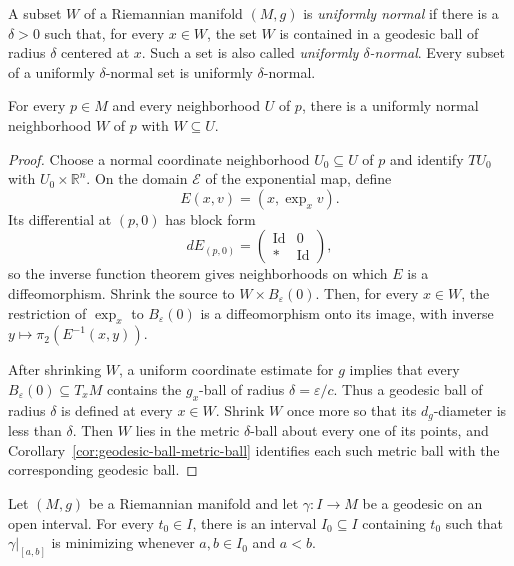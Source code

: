 A subset $W$ of a Riemannian manifold $(M,g)$ is \emph{uniformly normal} if
there is a $\delta>0$ such that, for every $x\in W$, the set $W$ is contained
in a geodesic ball of radius $\delta$ centered at $x$. Such a set is also called
\emph{uniformly $\delta$-normal}. Every subset of a uniformly
$\delta$-normal set is uniformly $\delta$-normal.

\begin{lemma}
\label{lem:uniformly-normal-neighborhood}
For every $p\in M$ and every neighborhood $U$ of $p$, there is a uniformly
normal neighborhood $W$ of $p$ with $W\subseteq U$.
\end{lemma}

\begin{proof}
\sketch Choose a normal coordinate neighborhood $U_0\subseteq U$ of $p$ and
identify $TU_0$ with $U_0\times\mathbb R^n$. On the domain $\mathcal E$ of the
exponential map, define
\[
E(x,v)=(x,\exp_xv).
\]
Its differential at $(p,0)$ has block form
\[
dE_{(p,0)}=
\begin{pmatrix}
\operatorname{Id}&0\\
*&\operatorname{Id}
\end{pmatrix},
\]
so the inverse function theorem gives neighborhoods on which $E$ is a
diffeomorphism. Shrink the source to $W\times B_\varepsilon(0)$. Then, for
every $x\in W$, the restriction of $\exp_x$ to $B_\varepsilon(0)$ is a
diffeomorphism onto its image, with inverse
$y\mapsto\pi_2(E^{-1}(x,y))$.

After shrinking $W$, a uniform coordinate estimate for $g$ implies that every
$B_\varepsilon(0)\subseteq T_xM$ contains the $g_x$-ball of radius
$\delta=\varepsilon/c$. Thus a geodesic ball of radius $\delta$ is defined at
every $x\in W$. Shrink $W$ once more so that its $d_g$-diameter is less than
$\delta$. Then $W$ lies in the metric $\delta$-ball about every one of its
points, and Corollary~\ref{cor:geodesic-ball-metric-ball} identifies each such
metric ball with the corresponding geodesic ball.
\end{proof}

\begin{theorem}
\label{thm:locally-minimizing-geodesics}
Let $(M,g)$ be a Riemannian manifold and let $\gamma\colon I\to M$ be a
geodesic on an open interval. For every $t_0\in I$, there is an interval
$I_0\subseteq I$ containing $t_0$ such that $\gamma|_{[a,b]}$ is minimizing
whenever $a,b\in I_0$ and $a<b$.
\end{theorem}

